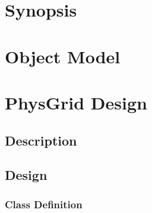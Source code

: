 \documentclass[]{article}
\begin{document}




\newpage
\tableofcontents

\newpage


\section{Synopsis}





%


\section{Object Model}




% 
% 

\section{PhysGrid Design}

\subsection{Description}




\subsection{Design}




\subsubsection{Class Definition}


\end{document}
